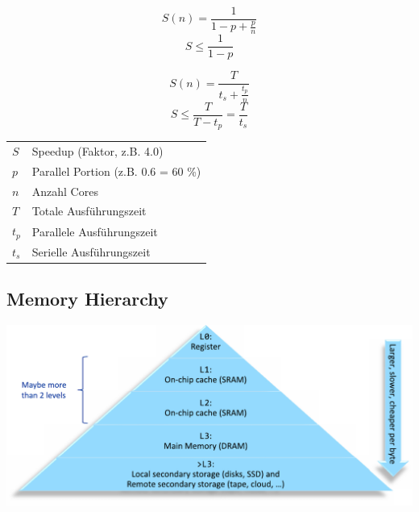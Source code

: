 
\begin{minipage}[c]{0.25\columnwidth}
    $$ S(n) = \frac{1}{1 - p + \frac{p}{n}} $$
    $$ S \leq \frac{1}{1-p} $$
\end{minipage}
\hfill
\begin{minipage}[c]{0.25\columnwidth}
    $$ S(n) = \frac{T}{t_s + \frac{t_p}{n}} $$
    $$ S \leq \frac{T}{T - t_p} = \frac{T}{t_s} $$
\end{minipage}
\hfill
\begin{minipage}[c]{0.48\columnwidth}
    \begin{tabular}{ll}
        $S$     & Speedup (Faktor, z.B. 4.0)            \\
        $p$     & Parallel Portion (z.B. 0.6 = 60 \%)   \\
        $n$     & Anzahl Cores                          \\
        $T$     & Totale Ausführungszeit                \\
        $t_p$   & Parallele Ausführungszeit             \\
        $t_s$   & Serielle Ausführungszeit  
    \end{tabular}
\end{minipage}


\subsection{Memory Hierarchy}

\begin{center}
    \includegraphics[width=0.88\columnwidth]{images/multiprocessor_memory.pdf}
\end{center}


